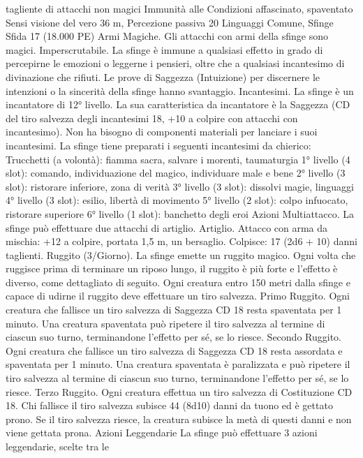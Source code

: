 \begin{multicols}{2}
tagliente di attacchi non magici
Immunità alle Condizioni affascinato, spaventato
Sensi visione del vero 36 m, Percezione passiva 20
Linguaggi Comune, Sfinge
Sfida 17 (18.000 PE)
Armi Magiche. Gli attacchi con armi della sfinge sono magici.
Imperscrutabile. La sfinge è immune a qualsiasi effetto in grado
di percepirne le emozioni o leggerne i pensieri, oltre che a
qualsiasi incantesimo di divinazione che rifiuti. Le prove di
Saggezza (Intuizione) per discernere le intenzioni o la sincerità
della sfinge hanno svantaggio.
Incantesimi. La sfinge è un incantatore di 12° livello. La sua
caratteristica da incantatore è la Saggezza (CD del tiro salvezza
degli incantesimi 18, +10 a colpire con attacchi con
incantesimo). Non ha bisogno di componenti materiali per
lanciare i suoi incantesimi. La sfinge tiene preparati i seguenti
incantesimi da chierico:
Trucchetti (a volontà): fiamma sacra, salvare i morenti,
taumaturgia
1° livello (4 slot): comando, individuazione del magico,
individuare male e bene
2° livello (3 slot): ristorare inferiore, zona di verità
3° livello (3 slot): dissolvi magie, linguaggi
4° livello (3 slot): esilio, libertà di movimento
5° livello (2 slot): colpo infuocato, ristorare superiore
6° livello (1 slot): banchetto degli eroi
Azioni
Multiattacco. La sfinge può effettuare due attacchi di artiglio.
Artiglio. Attacco con arma da mischia: +12 a colpire, portata 1,5
m, un bersaglio.
Colpisce: 17 (2d6 + 10) danni taglienti.
Ruggito (3/Giorno). La sfinge emette un ruggito magico. Ogni
volta che ruggisce prima di terminare un riposo lungo, il ruggito
è più forte e l’effetto è diverso, come dettagliato di seguito. Ogni
creatura entro 150 metri dalla sfinge e capace di udirne il ruggito
deve effettuare un tiro salvezza.
Primo Ruggito. Ogni creatura che fallisce un tiro salvezza di
Saggezza CD 18 resta spaventata per 1 minuto. Una creatura
spaventata può ripetere il tiro salvezza al termine di ciascun suo
turno, terminandone l’effetto per sé, se lo riesce.
Secondo Ruggito. Ogni creatura che fallisce un tiro salvezza di
Saggezza CD 18 resta assordata e spaventata per 1 minuto. Una
creatura spaventata è paralizzata e può ripetere il tiro salvezza al
termine di ciascun suo turno, terminandone l’effetto per sé, se lo
riesce.
Terzo Ruggito. Ogni creatura effettua un tiro salvezza di
Costituzione CD 18. Chi fallisce il tiro salvezza subisce 44
(8d10) danni da tuono ed è gettato prono. Se il tiro salvezza
riesce, la creatura subisce la metà di questi danni e non viene
gettata prona.
Azioni Leggendarie
La sfinge può effettuare 3 azioni leggendarie, scelte tra le

\end{multicols}
